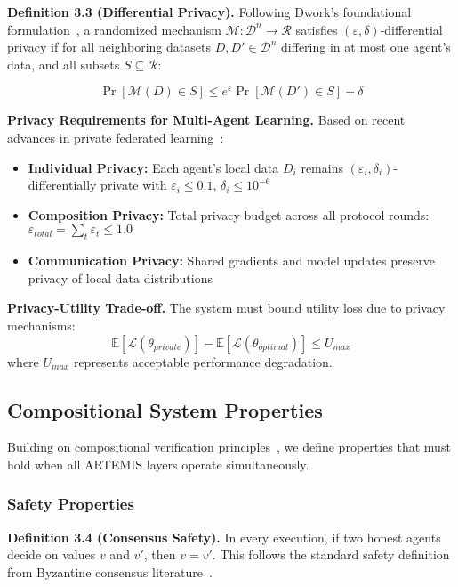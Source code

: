 \documentclass[conference]{IEEEtran}
\begin{document}
\textbf{Definition 3.3 (Differential Privacy).} Following Dwork's foundational formulation~\cite{dwork2014algorithmic}, a randomized mechanism $\mathcal{M}: \mathcal{D}^n \rightarrow \mathcal{R}$ satisfies $(\varepsilon, \delta)$-differential privacy if for all neighboring datasets $D, D' \in \mathcal{D}^n$ differing in at most one agent's data, and all subsets $S \subseteq \mathcal{R}$:

$$\Pr[\mathcal{M}(D) \in S] \leq e^\varepsilon \Pr[\mathcal{M}(D') \in S] + \delta$$

\textbf{Privacy Requirements for Multi-Agent Learning.} Based on recent advances in private federated learning~\cite{andrew2021differentially,mcmahan2018learning}:
\begin{itemize}
    \item \textbf{Individual Privacy:} Each agent's local data $D_i$ remains $(\varepsilon_i, \delta_i)$-differentially private with $\varepsilon_i \leq 0.1$, $\delta_i \leq 10^{-6}$
    \item \textbf{Composition Privacy:} Total privacy budget across all protocol rounds: $\varepsilon_{total} = \sum_t \varepsilon_t \leq 1.0$
    \item \textbf{Communication Privacy:} Shared gradients and model updates preserve privacy of local data distributions
\end{itemize}

\textbf{Privacy-Utility Trade-off.} The system must bound utility loss due to privacy mechanisms:
$$\mathbb{E}[\mathcal{L}(\theta_{private})] - \mathbb{E}[\mathcal{L}(\theta_{optimal})] \leq U_{max}$$
where $U_{max}$ represents acceptable performance degradation.

\subsection{Compositional System Properties}

Building on compositional verification principles~\cite{clarke1999model}, we define properties that must hold when all ARTEMIS layers operate simultaneously.

\subsubsection{Safety Properties}

\textbf{Definition 3.4 (Consensus Safety).} In every execution, if two honest agents decide on values $v$ and $v'$, then $v = v'$. This follows the standard safety definition from Byzantine consensus literature~\cite{castro1999practical}.
\end{document}
